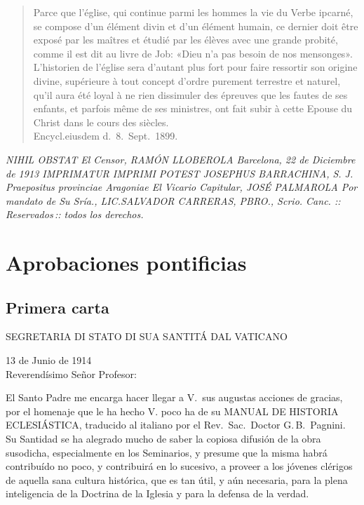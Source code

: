 \raggedbottom{} \documentclass[12pt, a4paper, openany]{book} %
\begin{document}
\begin{quotation}
  Parce que l'église, qui continue parmi les hommes la vie du Verbe ipcarné, se compose d'un élément divin et d'un élément humain, ce dernier doit être exposé par les maîtres et étudié par les élèves avec une grande probité, comme il est dit au livre de Job: «Dieu n'a pas besoin de nos mensonges». L'historien de l'église sera d'autant plus fort pour faire ressortir son origine divine, supérieure à tout concept d'ordre purement terrestre et naturel, qu'il aura été loyal à ne rien dissimuler des épreuves que les fautes de ses enfants, et parfois même de ses ministres, ont fait subir à cette Epouse du Christ dans le cours des siècles.\\
  Encycl.\@ eiusdem d.\ 8.\ Sept.\ 1899.
\end{quotation}
\textit{
  \noindent NIHIL OBSTAT El Censor, RAMÓN LLOBEROLA Barcelona, 22 de Diciembre de 1913 IMPRIMATUR IMPRIMI POTEST JOSEPHUS BARRACHINA, S. J. Praepositus provinciae Aragoniae El Vicario Capitular, JOSÉ PALMAROLA Por mandato de Su Sría., LIC.\@ SALVADOR CARRERAS, PBRO., Scrio. Canc. \quad::\, Reservados\,:: \quad todos los derechos.
}
\newpage
\section{Aprobaciones pontificias}
\subsection{Primera carta}
\begin{center}
  \large SEGRETARIA DI STATO DI SUA SANTITÁ DAL VATICANO
\end{center}
\begin{flushright}
  13 de Junio de 1914\\
  Reverendísimo Señor Profesor:
\end{flushright}

El Santo Padre me encarga hacer llegar a V.\ sus augustas acciones de gracias, por el homenaje que le ha hecho V. poco ha de su MANUAL DE HISTORIA ECLESIÁSTICA, traducido al italiano por el Rev.\, Sac.\, Doctor G.\,B.\, Pagnini. Su Santidad se ha alegrado mucho de saber la copiosa difusión de la obra susodicha, especialmente en los Seminarios, y presume que la misma habrá contribuído no poco, y contribuirá en lo sucesivo, a proveer a los jóvenes clérigos de aquella sana cultura histórica, que es tan útil, y aún necesaria, para la plena inteligencia de la Doctrina de la Iglesia y para la defensa de la verdad.
\end{document}
